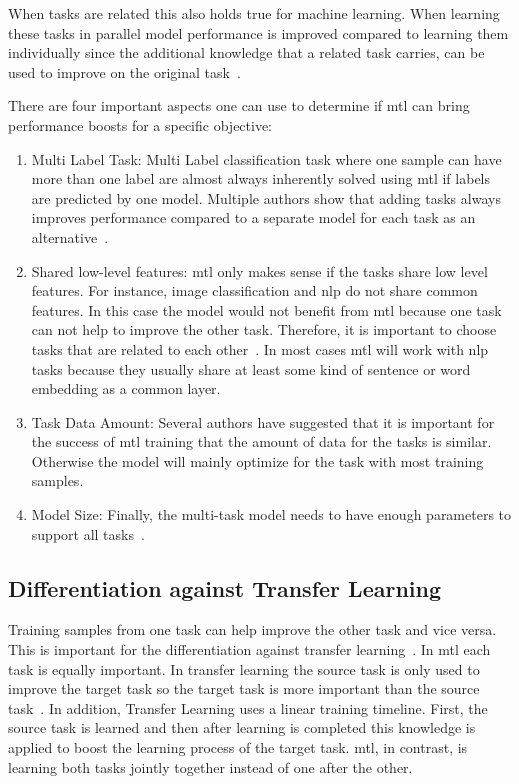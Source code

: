 When tasks are related this also holds true for machine learning. When learning these tasks in parallel model performance is improved compared to learning them individually since the additional knowledge that a related task carries, can be used to improve on the original task~\cite{Caruana1997a}. 

There are four important aspects one can use to determine if \gls{mtl} can bring performance boosts for a specific objective:
\begin{enumerate}
	\item Multi Label Task: Multi Label classification task where one sample can have more than one label are almost always inherently solved using \gls{mtl} if labels are predicted by one model. Multiple authors show that adding tasks always improves performance compared to a separate model for each task as an alternative~\cite{Ramsundar2015}. %
	\item Shared low-level features: \gls{mtl} only makes sense if the tasks share low level features. For instance, image classification and \gls{nlp} do not share common features. In this case the model would not benefit from \gls{mtl} because one task can not help to improve the other task. Therefore, it is important to choose tasks that are related to each other~\cite{Zhang2017a}. In most cases \gls{mtl} will work with \gls{nlp} tasks because they usually share at least some kind of sentence or word embedding as a common layer.   %
	\item Task Data Amount: Several authors have suggested that it is important for the success of \gls{mtl} training that the amount of data for the tasks is similar. Otherwise the model will mainly optimize for the task with most training samples.
	\item Model Size: Finally, the multi-task model needs to have enough parameters to support all tasks~\cite{Caruana1997a}. 
	\end{enumerate}


\subsection{Differentiation against Transfer Learning}

Training samples from one task can help improve the other task and vice versa. This is important for the differentiation against transfer learning~\cite{Pratt1993}. In \gls{mtl} each task is equally important. In transfer learning the source task is only used to improve the target task so the target task is more important than the source task~\cite{Zhang2017a}. In addition, Transfer Learning uses a linear training timeline. First, the source task is learned and then after learning is completed this knowledge is applied to boost the learning process of the target task. \gls{mtl}, in contrast, is learning both tasks jointly together instead of one after the other.



